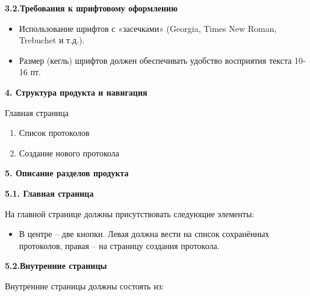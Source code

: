 \documentclass[12pt,a4paper]{article}
\begin{document}
	
	\textbf{3.2.Требования к шрифтовому оформлению}

	\begin{itemize}
		\item	Использование шрифтов с «засечками» (Georgia, Times New Roman, Trebuchet и т.д.).
		\item	Размер (кегль) шрифтов должен обеспечивать удобство восприятия текста 10-16 пт.
	\end{itemize}
		
	\textbf{4. Структура продукта и навигация  }
	
		Главная страница
		
	\begin{enumerate}
		\item	Список протоколов
		\item	Создание нового протокола
	\end{enumerate}
	
	\textbf{5. Описание разделов продукта}
	
	
	\textbf{5.1. Главная страница}
	
	На главной странице должны присутствовать следующие элементы:
	
	\begin{itemize}
		\item	В центре – две кнопки. Левая должна вести на список сохранённых протоколов, правая – на страницу создания протокола.
	\end{itemize}
	
	
	\textbf{5.2.Внутренние страницы}
	
	Внутренние страницы должны состоять из:
	
\end{document}
